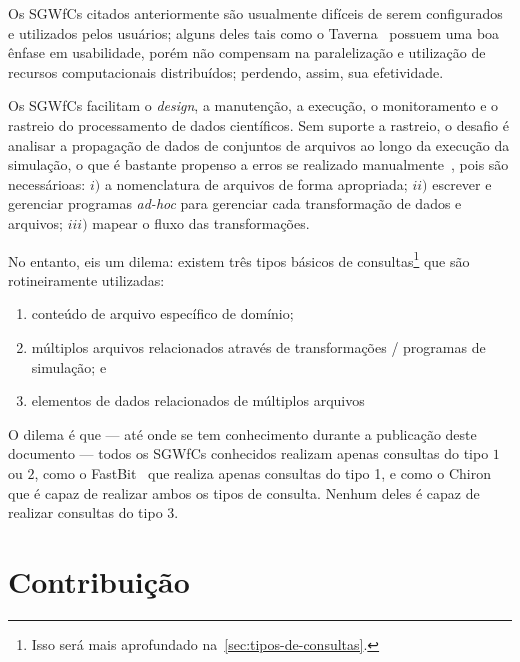 
Os SGWfCs citados anteriormente são usualmente difíceis de serem configurados e utilizados pelos usuários; alguns deles tais como o Taverna~\cite{hull2006taverna} possuem uma boa ênfase em usabilidade, porém não compensam na paralelização e utilização de recursos computacionais distribuídos; perdendo, assim, sua efetividade.

Os SGWfCs facilitam o \textit{design}, a manutenção, a execução, o monitoramento e o rastreio do processamento de dados científicos. Sem suporte a rastreio, o desafio é analisar a propagação de dados de conjuntos de arquivos ao longo da execução da simulação, o que é bastante propenso a erros se realizado manualmente~\cite{silva2015analyzing}, pois são necessárioas: \( i) \) a nomenclatura de arquivos de forma apropriada; \( ii) \) escrever e gerenciar programas \textit{ad-hoc} para gerenciar cada transformação de dados e arquivos; \( iii) \) mapear o fluxo das transformações.

No entanto, eis um dilema: existem três tipos básicos de consultas\footnote{Isso será mais aprofundado na~\autoref{sec:tipos-de-consultas}.} que são rotineiramente utilizadas:

\begin{enumerate}
    \item conteúdo de arquivo específico de domínio;
    \item múltiplos arquivos relacionados através de transformações / programas de simulação; e
    \item elementos de dados relacionados de múltiplos arquivos
\end{enumerate}

O dilema é que --- até onde se tem conhecimento durante a publicação deste documento --- todos os SGWfCs conhecidos realizam apenas consultas do tipo \( 1 \) ou \( 2 \), como o FastBit~\cite{wu2009fastbit} que realiza apenas consultas do tipo 1, e como o Chiron~\cite{ogasawara2013chiron} que é capaz de realizar ambos os tipos de consulta. Nenhum deles é capaz de realizar consultas do tipo 3.

\section{Contribuição} %

